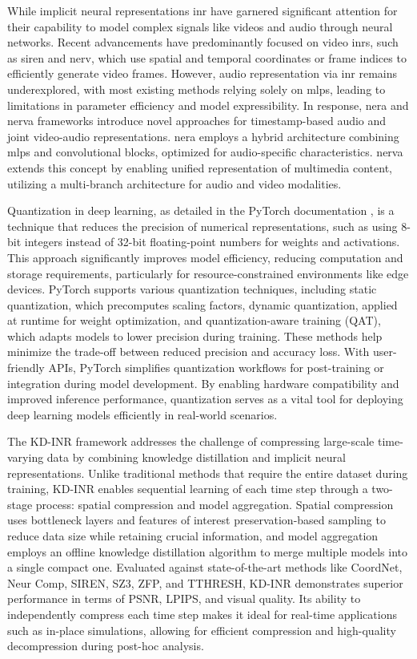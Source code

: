 While implicit neural representations \gls{inr} have garnered significant attention for their capability to model complex signals like videos and audio through neural networks. Recent advancements have predominantly focused on video \gls{inr}s, such as \gls{siren} and \gls{nerv}, which use spatial and temporal coordinates or frame indices to efficiently generate video frames. However, audio representation via \gls{inr} remains underexplored, with most existing methods relying solely on \gls{mlp}s, leading to limitations in parameter efficiency and model expressibility. In response, \gls{nera} and \gls{nerva} frameworks \cite{NeRVA-2024} introduce novel approaches for timestamp-based audio and joint video-audio representations. \gls{nera} employs a hybrid architecture combining \gls{mlp}s and convolutional blocks, optimized for audio-specific characteristics. \gls{nerva} extends this concept by enabling unified representation of multimedia content, utilizing a multi-branch architecture for audio and video modalities.

Quantization in deep learning, as detailed in the PyTorch documentation \cite{pytorchQuantizationx2014}, is a technique that reduces the precision of numerical representations, such as using 8-bit integers instead of 32-bit floating-point numbers for weights and activations. This approach significantly improves model efficiency, reducing computation and storage requirements, particularly for resource-constrained environments like edge devices. PyTorch supports various quantization techniques, including static quantization, which precomputes scaling factors, dynamic quantization, applied at runtime for weight optimization, and quantization-aware training (QAT), which adapts models to lower precision during training. These methods help minimize the trade-off between reduced precision and accuracy loss. With user-friendly APIs, PyTorch simplifies quantization workflows for post-training or integration during model development. By enabling hardware compatibility and improved inference performance, quantization serves as a vital tool for deploying deep learning models efficiently in real-world scenarios.

The KD-INR framework \cite{DBLP:journals/tvcg/HanZB24} addresses the challenge of compressing large-scale time-varying data by combining knowledge distillation and implicit neural representations. Unlike traditional methods that require the entire dataset during training, KD-INR enables sequential learning of each time step through a two-stage process: spatial compression and model aggregation. Spatial compression uses bottleneck layers and features of interest preservation-based sampling to reduce data size while retaining crucial information, and model aggregation employs an offline knowledge distillation algorithm to merge multiple models into a single compact one. Evaluated against state-of-the-art methods like CoordNet, Neur Comp, SIREN, SZ3, ZFP, and TTHRESH, KD-INR demonstrates superior performance in terms of PSNR, LPIPS, and visual quality. Its ability to independently compress each time step makes it ideal for real-time applications such as in-place simulations, allowing for efficient compression and high-quality decompression during post-hoc analysis.

